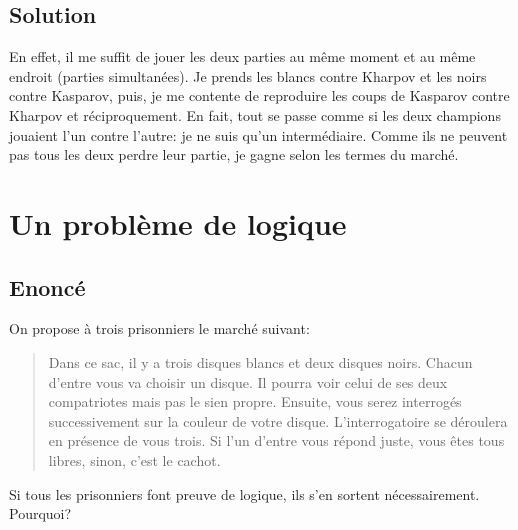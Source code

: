 \documentclass{article}
\begin{document}
\subsection{Solution}
En effet, il me suffit de jouer les deux parties au même moment et au même endroit (parties simultanées). Je prends les blancs contre Kharpov et les noirs contre Kasparov, puis, je me contente de reproduire les coups de Kasparov contre Kharpov et réciproquement. En fait, tout se passe comme si les deux champions jouaient l'un contre l'autre: je ne suis qu'un intermédiaire. Comme ils ne peuvent pas tous les deux perdre leur partie, je gagne selon les termes du marché.
\pagebreak

\section{Un problème de logique}

\subsection{Enoncé}
On propose à trois prisonniers le marché suivant:
\begin{quote}
Dans ce sac, il y a trois disques blancs et deux disques noirs. Chacun d'entre vous va choisir un disque. Il pourra voir celui de ses deux compatriotes mais pas le sien propre. Ensuite, vous serez interrogés successivement sur la couleur de votre disque. L'interrogatoire se déroulera en présence de vous trois. Si l'un d'entre vous répond juste, vous êtes tous libres, sinon, c'est le cachot.
\end{quote}
Si tous les prisonniers font preuve de logique, ils s'en sortent nécessairement. Pourquoi?
\end{document}
